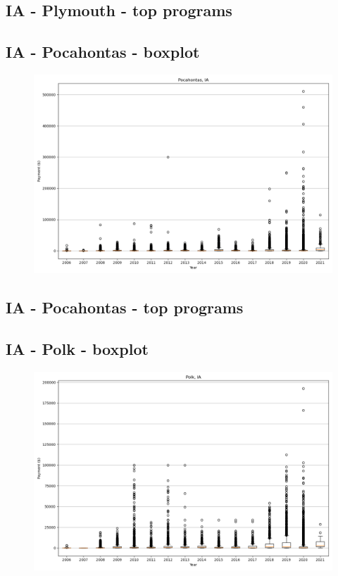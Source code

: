 \subsection*{IA - Plymouth - top programs}

\newpage
\subsection*{IA - Pocahontas - boxplot}
\begin{figure}[h]
\centering
\includegraphics[width=7in]{../output/boxplots/counties/Pocahontas-IA_boxplot.png}
\end{figure}


\subsection*{IA - Pocahontas - top programs}

\newpage
\subsection*{IA - Polk - boxplot}
\begin{figure}[h]
\centering
\includegraphics[width=7in]{../output/boxplots/counties/Polk-IA_boxplot.png}
\end{figure}


